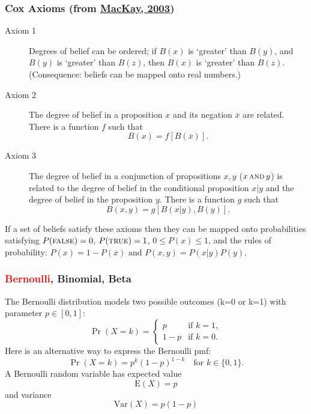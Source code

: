 \documentclass[ignorenonframetext]{beamer}
\begin{document}
\begin{frame}\frametitle{Cox Axioms (from \href{http://www.inference.phy.cam.ac.uk/itila}{MacKay, 2003})}\small

\begin{description}
\item[Axiom 1\puncspace] Degrees of belief can be ordered;
  if $B(x)$ is `greater' than $B(y)$, and 
  $B(y)$ is `greater' than $B(z)$, then
   $B(x)$ is `greater' than $B(z)$.
  ({\sf Consequence:} beliefs can be mapped onto real numbers.)
\item[Axiom 2\puncspace]  The degree of belief in a proposition $x$
  and its negation  $\overline{x}$ are related. There is a
  function $f$ such that
\[
B(x) = f[ B( \overline{x} ) ] .
\]
\item[Axiom 3\puncspace]   The degree of belief in a conjunction  of
  propositions
  $x,y$ ($x\,\mbox{\sc and}\,y$)
  is related to 
 the degree of belief in the conditional proposition $x | y$
 and  the degree of belief in the proposition $y$.
 There is a function  $g$ such that
\[
B(x,y) = g \left[ B(x | y)  , B(y) \right] .
\]
\end{description}

If a set of beliefs satisfy these
 axioms then they can be mapped onto probabilities satisfying
 $P(\mbox{\sc false}) = 0$,
 $P(\mbox{\sc true}) = 1$,
 $0 \leq P(x) \leq  1$, and 
 the rules of probability: $
 P(x) = 1 - P( \overline{x} ) \mbox{ and }
 P(x,y) =  P(x | y)  P(y).
$
\end{frame}

\begin{frame}\frametitle{\textcolor{red}{Bernoulli}, Binomial, Beta}
The Bernoulli distribution models two possible outcomes (k=0 or k=1)
with parameter $p\in [0,1]$:\[
\Pr(X=k) = \begin{cases} p & \text{if }k=1, \\[6pt] 1-p & \text {if
  }k=0.\end{cases}
\]
Here is an alternative way to express the Bernoulli pmf:\[
\Pr(X=k) = p^k (1-p)^{1-k}\!\quad \text{for }k\in\{0,1\}.
\]
A Bernoulli random variable has expected value \[
\mbox{E}(X)=p
\] and variance \[
\mbox{Var}(X)=p(1-p)
\]
\end{frame}
\end{document}
